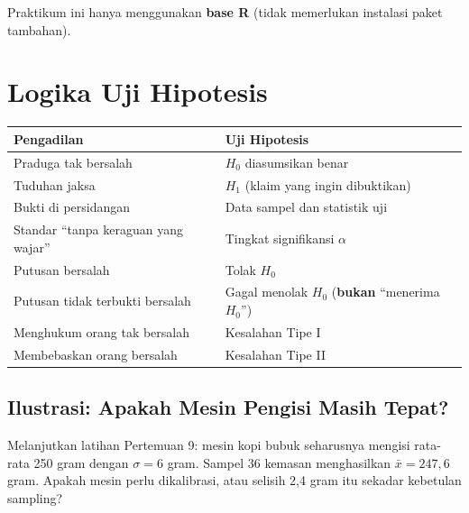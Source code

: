 \documentclass[
  indonesian,
  letterpaper,
]{book}
\newcounter{none} %
\begin{document}
Praktikum ini hanya menggunakan \textbf{base R} (tidak memerlukan
instalasi paket tambahan).


\chapter{Logika Uji Hipotesis}\label{logika-uji-hipotesis}

{\def\LTcaptype{none} %
\begin{longtable}[]{@{}
  >{\raggedright\arraybackslash}p{}
  >{\raggedright\arraybackslash}p{}@{}}
\toprule\noalign{}
\begin{minipage}[b]{\linewidth}\raggedright
Pengadilan
\end{minipage} & \begin{minipage}[b]{\linewidth}\raggedright
Uji Hipotesis
\end{minipage} \\
\midrule\noalign{}
\endhead
\bottomrule\noalign{}
\endlastfoot
Praduga tak bersalah & \(H_0\) diasumsikan benar \\
Tuduhan jaksa & \(H_1\) (klaim yang ingin dibuktikan) \\
Bukti di persidangan & Data sampel dan statistik uji \\
Standar ``tanpa keraguan yang wajar'' & Tingkat signifikansi
\(\alpha\) \\
Putusan bersalah & Tolak \(H_0\) \\
Putusan tidak terbukti bersalah & Gagal menolak \(H_0\) (\textbf{bukan}
``menerima \(H_0\)'') \\
Menghukum orang tak bersalah & Kesalahan Tipe I \\
Membebaskan orang bersalah & Kesalahan Tipe II \\
\end{longtable}
}

\section{Ilustrasi: Apakah Mesin Pengisi Masih
Tepat?}\label{ilustrasi-apakah-mesin-pengisi-masih-tepat}

Melanjutkan latihan Pertemuan 9: mesin kopi bubuk seharusnya mengisi
rata-rata 250 gram dengan \(\sigma = 6\) gram. Sampel 36 kemasan
menghasilkan \(\bar{x} = 247{,}6\) gram. Apakah mesin perlu dikalibrasi,
atau selisih 2,4 gram itu sekadar kebetulan sampling?
\end{document}
